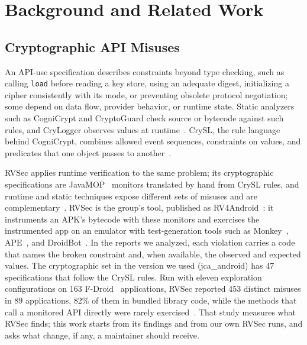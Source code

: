 \documentclass[conference]{IEEEtran}
\begin{document}
\section{Background and Related Work}
\label{sec:background}

\subsection{Cryptographic API Misuses}

An API-use specification describes constraints beyond type checking, such as
calling \texttt{load} before reading a key store, using an adequate digest,
initializing a cipher consistently with its mode, or preventing obsolete
protocol negotiation; some depend on data flow, provider behavior, or runtime
state. Static analyzers such as CogniCrypt
and CryptoGuard check source or bytecode against such rules, and CryLogger
observes values at
runtime~\cite{krueger2017cognicrypt,rahaman2019cryptoguard,piccolboni2021crylogger}.
CrySL, the rule language behind CogniCrypt, combines allowed event sequences,
constraints on values, and predicates that one object passes to
another~\cite{krueger2021crysl}.

RVSec applies runtime verification to the same problem; its cryptographic
specifications are JavaMOP~\cite{jin2012javamop} monitors translated by hand
from CrySL rules, and runtime and static techniques expose different sets of
misuses and are complementary~\cite{torres2023runtime}. RVSec is the group's
tool, published as RV4Android~\cite{costa2026rv4android}: it instruments an
APK's bytecode with these monitors and exercises the instrumented app on an
emulator with test-generation tools such as Monkey~\cite{androidmonkey},
APE~\cite{gu2019ape}, and DroidBot~\cite{li2017droidbot}. In the reports we
analyzed, each violation carries a code that names the broken constraint and,
when available, the observed and expected values. The cryptographic set in the
version we used (jca\_android) has 47 specifications that follow the CrySL
rules. Run with eleven exploration configurations on 163
F-Droid~\cite{fdroid} applications, RVSec reported 453 distinct misuses in 89 applications, 82\% of
them in bundled library code, while the methods that call a monitored API
directly were rarely exercised~\cite{costa2026effectiveness}. That study
measures what RVSec finds; this work starts from its findings and from our own
RVSec runs, and asks what change, if any, a maintainer should receive.
\end{document}
